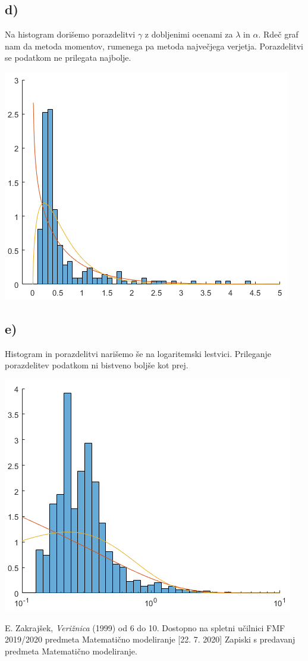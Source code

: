 \documentclass[A4paper, 11pt]{article}
\begin{document}
\subsection*{d)}
Na histogram dorišemo porazdelitvi $\gamma$ z dobljenimi ocenami za $\lambda$ in $\alpha$. Rdeč graf nam da metoda momentov, rumenega pa metoda največjega verjetja. Porazdelitvi se podatkom ne prilegata najbolje.

\includegraphics[scale=0.8]{Kiti_2}


\subsection*{e)}
Histogram in porazdelitvi narišemo še na logaritemski lestvici. Prileganje porazdelitev podatkom ni bistveno boljše kot prej.

\includegraphics[scale=0.8]{Kiti_3}




\begin{thebibliography}{9}
	E. Zakrajšek, \emph{Verižnica} (1999) od 6 do 10.
	Dostopno na spletni učilnici FMF 2019/2020 predmeta Matematično modeliranje [22. 7. 2020]
	Zapiski s predavanj predmeta Matematično modeliranje.
\end{thebibliography}
\end{document}
